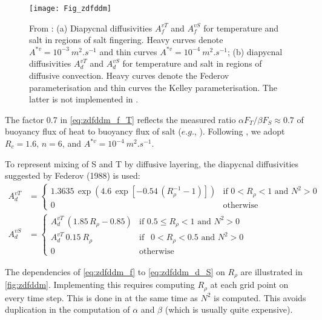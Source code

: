\documentclass[../tex_main/NEMO_manual]{subfiles}
\begin{document}
\begin{figure}[!t]   \begin{center}
\texttt{[image: Fig\_zdfddm]}
\caption{  \protect\label{fig:zdfddm}
  From \citet{Merryfield1999} :
  (a) Diapycnal diffusivities $A_f^{vT}$ and $A_f^{vS}$ for temperature and salt in regions of salt fingering.
  Heavy curves denote $A^{\ast v} = 10^{-3}~m^2.s^{-1}$ and thin curves $A^{\ast v} = 10^{-4}~m^2.s^{-1}$;
  (b) diapycnal diffusivities $A_d^{vT}$ and $A_d^{vS}$ for temperature and salt in regions of diffusive convection.
  Heavy curves denote the Federov parameterisation and thin curves the Kelley parameterisation.
  The latter is not implemented in \NEMO. }
\end{center}    \end{figure}

The factor 0.7 in \autoref{eq:zdfddm_f_T} reflects the measured ratio $\alpha F_T /\beta F_S \approx  0.7$ of
buoyancy flux of heat to buoyancy flux of salt ($e.g.$, \citet{McDougall_Taylor_JMR84}).
Following  \citet{Merryfield1999}, we adopt $R_c = 1.6$, $n = 6$, and $A^{\ast v} = 10^{-4}~m^2.s^{-1}$.

To represent mixing of S and T by diffusive layering,  the diapycnal diffusivities suggested by
Federov (1988) is used: 
\begin{align} 	\label{eq:zdfddm_d}
A_d^{vT} &= 	\begin{cases}
	1.3635 \, \exp{\left( 4.6\, \exp{ \left[  -0.54\,( R_{\rho}^{-1} - 1 )  \right] }    \right)}
									&\text{if  $0<R_\rho < 1$ and $N^2>0$ } \\
	0 								&\text{otherwise} 
				\end{cases}   
\\   			\label{eq:zdfddm_d_S}
A_d^{vS} &= 	\begin{cases}
	A_d^{vT}\ \left( 1.85\,R_{\rho} - 0.85 \right)
									&\text{if  $0.5 \leq R_\rho<1$ and $N^2>0$ } \\
	A_d^{vT} \ 0.15 \ R_\rho
									&\text{if  $\ \ 0 < R_\rho<0.5$ and $N^2>0$ } \\
	0 								&\text{otherwise} 
				\end{cases}   
\end{align}

The dependencies of \autoref{eq:zdfddm_f} to \autoref{eq:zdfddm_d_S} on $R_\rho$ are illustrated in
\autoref{fig:zdfddm}.
Implementing this requires computing $R_\rho$ at each grid point on every time step.
This is done in  at the same time as $N^2$ is computed.
This avoids duplication in the computation of $\alpha$ and $\beta$ (which is usually quite expensive).
\end{document}
